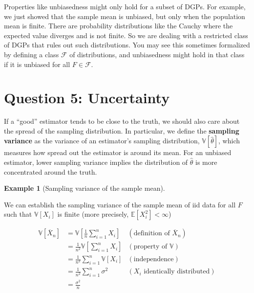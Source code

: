 \documentclass[
  letterpaper,
  DIV=11,
  numbers=noendperiod]{scrreprt}
\newcommand{\E}{\mathbb{E}}
\newcommand{\V}{\mathbb{V}}
\newcommand{\Xbar}{\overline{X}}
\theoremstyle{definition}
\newtheorem{example}{Example}[chapter]
\theoremstyle{definition}
\theoremstyle{plain}
\theoremstyle{remark}
\begin{document}
\begin{tcolorbox}[enhanced jigsaw, colbacktitle=quarto-callout-warning-color!10!white, breakable, toptitle=1mm, opacityback=0, leftrule=.75mm, rightrule=.15mm, coltitle=black, opacitybacktitle=0.6, toprule=.15mm, arc=.35mm, bottomtitle=1mm, titlerule=0mm, title=\textcolor{quarto-callout-warning-color}{\faExclamationTriangle}\hspace{0.5em}{Warning}, colframe=quarto-callout-warning-color-frame, bottomrule=.15mm, colback=white, left=2mm]

Properties like unbiasedness might only hold for a subset of DGPs. For
example, we just showed that the sample mean is unbiased, but only when
the population mean is finite. There are probability distributions like
the Cauchy where the expected value diverges and is not finite. So we
are dealing with a restricted class of DGPs that rules out such
distributions. You may see this sometimes formalized by defining a class
\(\mathcal{F}\) of distributions, and unbiasedness might hold in that
class if it is unbiased for all \(F \in \mathcal{F}\).

\end{tcolorbox}

\hypertarget{question-5-uncertainty-1}{%
\section{Question 5: Uncertainty}\label{question-5-uncertainty-1}}

If a ``good'' estimator tends to be close to the truth, we should also
care about the spread of the sampling distribution. In particular, we
define the \textbf{sampling variance} as the variance of an estimator's
sampling distribution, \(\V[\widehat{\theta}]\), which measures how
spread out the estimator is around its mean. For an unbiased estimator,
lower sampling variance implies the distribution of \(\widehat{\theta}\)
is more concentrated around the truth.

\begin{example}[Sampling variance of the sample
mean]\protect\hypertarget{exm-mean-var}{}\label{exm-mean-var}

We can establish the sampling variance of the sample mean of iid data
for all \(F\) such that \(\V[X_i]\) is finite (more precisely,
\(\E[X_i^2] < \infty\))

\[\begin{aligned}
  \V\left[ \Xbar_n \right] &= \V\left[ \frac{1}{n} \sum_{i=1}^n X_i \right] & (\text{definition of } \Xbar_n) \\
                           &= \frac{1}{n^2} \V\left[ \sum_{i=1}^n X_i \right] & (\text{property of } \V) \\
                           &= \frac{1}{n^2} \sum_{i=1}^n \V[X_i] & (\text{independence}) \\
                           &= \frac{1}{n^2} \sum_{i=1}^n \sigma^2 & (X_i \text{ identically distributed}) \\
                           &= \frac{\sigma^2}{n}
\end{aligned}\]

\end{example}
\end{document}
